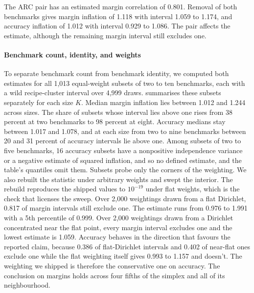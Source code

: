 The ARC pair has an estimated margin correlation of 0.801. Removal of both benchmarks gives margin inflation of 1.118 with interval 1.059 to 1.174, and accuracy inflation of 1.012 with interval 0.929 to 1.086. The pair affects the estimate, although the remaining margin interval still excludes one.
\paragraph{Benchmark count, identity, and weights}
\label{app:composition}
To separate benchmark count from benchmark identity, we computed both estimates for all 1,013 equal-weight subsets of two to ten benchmarks, each with a wild recipe-cluster interval over 4,999 draws.  summarises these subsets separately for each size $K$. Median margin inflation lies between 1.012 and 1.244 across sizes. The share of subsets whose interval lies above one rises from 38 percent at two benchmarks to 98 percent at eight. Accuracy medians stay between 1.017 and 1.078, and at each size from two to nine benchmarks between 20 and 31 percent of accuracy intervals lie above one. Among subsets of two to five benchmarks, 16 accuracy subsets have a nonpositive independence variance or a negative estimate of squared inflation, and so no defined estimate, and the table's quantiles omit them. Subsets probe only the corners of the weighting. We also rebuilt the statistic under arbitrary weights and swept the interior. The rebuild reproduces the shipped values to $10^{-19}$ under flat weights, which is the check that licenses the sweep. Over 2,000 weightings drawn from a flat Dirichlet, 0.817 of margin intervals still exclude one. The estimate runs from 0.976 to 1.991 with a 5th percentile of 0.999. Over 2,000 weightings drawn from a Dirichlet concentrated near the flat point, every margin interval excludes one and the lowest estimate is 1.059. Accuracy behaves in the direction that favours the reported claim, because 0.386 of flat-Dirichlet intervals and 0.402 of near-flat ones exclude one while the flat weighting itself gives 0.993 to 1.157 and doesn't. The weighting we shipped is therefore the conservative one on accuracy. The conclusion on margins holds across four fifths of the simplex and all of its neighbourhood.

